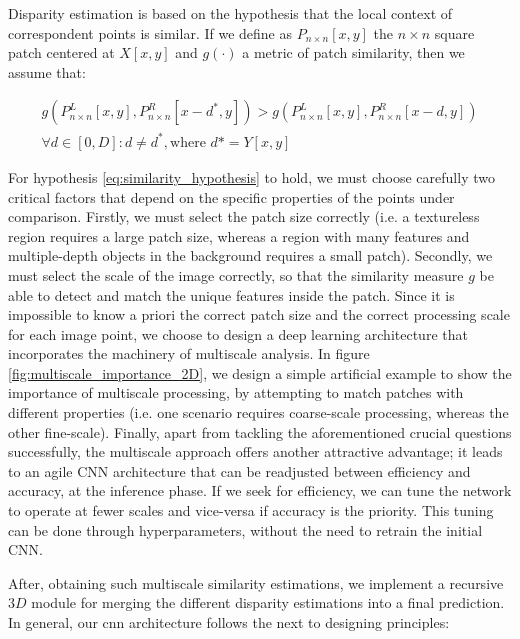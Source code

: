 \documentclass[10pt]{article}
\begin{document}
Disparity estimation is based on the hypothesis that the local context of correspondent points is similar. If we define as $P_{n \times n}[x,y]$ the  $n \times n$ square patch centered at $X[x,y]$ and $g(\cdot)$ a metric of patch similarity, then we assume that:

\begin{equation}
\begin{gathered} \label{eq:similarity_hypothesis}
    g(P^L_{n \times n}[x,y], P^R_{n \times n}[x-d^*,y]) > g(P^L_{n \times n}[x,y], P^R_{n \times n}[x-d,y]) \\
    \forall d \in [0,D] : d \neq d^*, \text{where $d* = Y[x,y]$}
\end{gathered}
\end{equation}

For hypothesis \ref{eq:similarity_hypothesis} to hold, we must choose carefully two critical factors that depend on the specific properties of the points under comparison. Firstly, we must select the patch size correctly (i.e. a textureless region requires a large patch size, whereas a region with many features and multiple-depth objects in the background requires a small patch). Secondly, we must select the scale of the image correctly, so that the similarity measure $g$ be able to detect and match the unique features inside the patch. Since it is impossible to know a priori the correct patch size and the correct processing scale for each image point, we choose to design a deep learning architecture that incorporates the machinery of multiscale analysis. In figure \ref{fig:multiscale_importance_2D}, we design a simple artificial example to show the importance of multiscale processing, by attempting to match patches with different properties (i.e. one scenario requires coarse-scale processing, whereas the other fine-scale). Finally, apart from tackling the aforementioned crucial questions successfully, the multiscale approach offers another attractive advantage; it leads to an agile CNN architecture that can be readjusted between efficiency and accuracy, at the inference phase. If we seek for efficiency, we can tune the network to operate at fewer scales and vice-versa if accuracy is the priority. This tuning can be done through hyperparameters, without the need to retrain the initial CNN.

After, obtaining such multiscale similarity estimations, we implement a recursive $3D$ module for merging the different disparity estimations into a final prediction. In general, our cnn architecture follows the next to designing principles:
\end{document}
